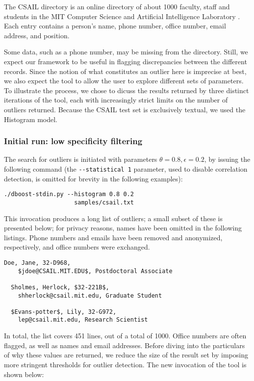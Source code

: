 The CSAIL directory is an online directory of about 1000 faculty, staff and students in the MIT Computer Science and Artificial Intelligence Laboratory \cite{CSAILDirectory}. Each entry contains a person's name, phone number, office number, email address, and position.

Some data, such as a phone number, may be missing from the directory. Still, we expect our framework to be useful in flagging discrepancies between the different records. Since the notion of what constitutes an outlier here is imprecise at best, we also expect the tool to allow the user to explore different sets of parameters. To illustrate the process, we chose to dicuss the results returned by three distinct iterations of the tool, each with increasingly strict limits on the number of outliers returned. Because the CSAIL test set is exclusively textual, we used the Histogram model.

\subsubsection{Initial run: low specificity filtering}
The search for outliers is initiated with parameters $\theta = 0.8, \epsilon = 0.2$, by issuing the following command (the \lstinline{--statistical 1} parameter, used to disable correlation detection, is omitted for brevity in the following examples):

\begin{lstlisting}[gobble=2]
  ./dboost-stdin.py --histogram 0.8 0.2 
                    samples/csail.txt
\end{lstlisting}

This invocation produces a long list of outliers; a small subset of these is presented below; for privacy reasons, names have been omitted in the following listings. Phone numbers and emails have been removed and anonymized, respectively, and office numbers were exchanged.

\begin{lstlisting}[gobble=2]
  Doe, Jane, 32-D968, 
    $jdoe@CSAIL.MIT.EDU$, Postdoctoral Associate

  Sholmes, Herlock, $32-221B$, 
    shherlock@csail.mit.edu, Graduate Student

  $Evans-potter$, Lily, 32-G972, 
    lep@csail.mit.edu, Research Scientist
\end{lstlisting}

In total, the list covers 451 lines, out of a total of 1000. Office numbers are often flagged, as well as names and email addresses. Before diving into the particulars of why these values are returned, we reduce the size of the result set by imposing more stringent thresholds for outlier detection. The new invocation of the tool is shown below: 

